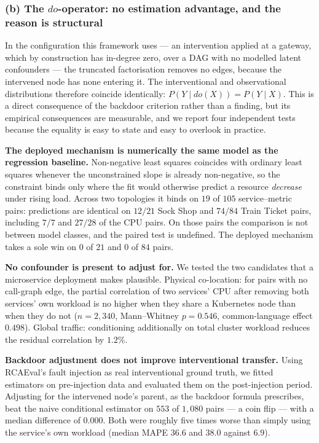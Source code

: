 \documentclass[journal, 10pt]{IEEEtran}
\begin{document}
\subsubsection{(b) The $do$-operator: no estimation advantage, and the reason is structural}
\label{sec:rq5-do}

In the configuration this framework uses --- an intervention applied at a
gateway, which by construction has in-degree zero, over a DAG with no modelled
latent confounders --- the truncated factorisation removes no edges, because the
intervened node has none entering it. The interventional and observational
distributions therefore coincide identically:
$P(Y \mid do(X)) = P(Y \mid X)$. This is a direct consequence of the backdoor
criterion rather than a finding, but its empirical consequences are measurable,
and we report four independent tests because the equality is easy to state and
easy to overlook in practice.

\textbf{The deployed mechanism is numerically the same model as the regression
baseline.} Non-negative least squares coincides with ordinary least squares
whenever the unconstrained slope is already non-negative, so the constraint binds
only where the fit would otherwise predict a resource \emph{decrease} under
rising load. Across two topologies it binds on $19$ of $105$ service--metric
pairs: predictions are identical on $12/21$ Sock Shop and $74/84$ Train Ticket
pairs, including $7/7$ and $27/28$ of the CPU pairs. On those pairs the
comparison is not between model classes, and the paired test is undefined. The
deployed mechanism takes a sole win on $0$ of $21$ and $0$ of $84$ pairs.

\textbf{No confounder is present to adjust for.} We tested the two candidates
that a microservice deployment makes plausible. Physical co-location: for pairs
with no call-graph edge, the partial correlation of two services' CPU after
removing both services' own workload is no higher when they share a Kubernetes
node than when they do not ($n=2{,}340$, Mann--Whitney $p=0.546$,
common-language effect $0.498$). Global traffic: conditioning additionally on
total cluster workload reduces the residual correlation by $1.2\%$.

\textbf{Backdoor adjustment does not improve interventional transfer.} Using
RCAEval's fault injection as real interventional ground truth, we fitted
estimators on pre-injection data and evaluated them on the post-injection period.
Adjusting for the intervened node's parent, as the backdoor formula prescribes,
beat the naive conditional estimator on $553$ of $1{,}080$ pairs --- a coin flip
--- with a median difference of $0.000$. Both were roughly five times worse than
simply using the service's own workload (median MAPE $36.6$ and $38.0$ against
$6.9$).
\end{document}
